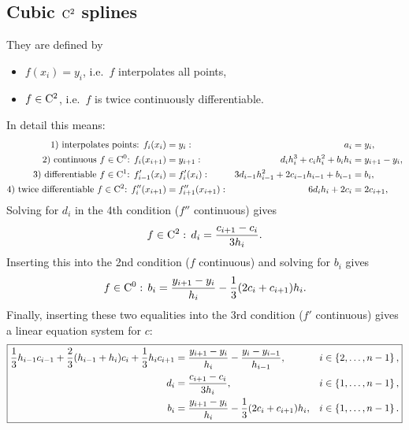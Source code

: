 \subsection{Cubic $\mathrm{C}^2$ splines}
They are defined by
\begin{itemize}
   \item $f(x_i) = y_i$, i.e.\ $f$ interpolates all points,
   \item $f\in\mathrm{C}^2$, i.e.\ $f$ is twice continuously differentiable.
\end{itemize}
In detail this means:
\begin{equation*}
\begin{aligned}
   \text{1) interpolates points: } f_i(x_i) & = y_i: &
    a_i & = y_i,\\
   \text{2) continuous } f\in\mathrm{C}^0 \text{: } f_i(x_{i+1}) & =y_{i+1}: &
	d_i h_i^3 + c_i h_i^2 + b_i h_i & = y_{i+1}-y_i,\\
  \text{3) differentiable }f\in\mathrm{C}^1 \text{: } f'_{i-1}(x_i) & =
    f'_i(x_i): &
    3 d_{i-1} h_{i-1}^2 + 2 c_{i-1} h_{i-1} + b_{i-1} & = b_i,\\
   \text{4) twice differentiable }f\in\mathrm{C}^2 \text{: } f''_i(x_{i+1}) & =
    f''_{i+1}(x_{i+1}): &
    6 d_i h_i + 2 c_i & = 2 c_{i+1},\\
\end{aligned}
\end{equation*}
Solving for $d_i$ in the 4th condition ($f''$ continuous) gives
\begin{equation*}
    f\in\mathrm{C}^2:\, d_i  =\frac{c_{i+1}-c_i}{3 h_i}.
\end{equation*}
Inserting this into the 2nd condition ($f$ continuous) and
solving for $b_i$ gives
\begin{equation*}
    f\in\mathrm{C}^0:\, b_i  = \frac{y_{i+1}-y_i}{h_i} - \frac{1}{3} (2 c_i + c_{i+1}) h_i.
\end{equation*}
Finally, inserting these two equalities into the 3rd condition
($f'$ continuous) gives a linear equation system for $c$:
\begin{equation}
\label{eq:cubic_c2_spline_coeffs}
\boxed{
\begin{aligned}
 \frac{1}{3} h_{i-1} c_{i-1} + \frac{2}{3} (h_{i-1}+h_i) c_i
 + \frac{1}{3} h_i c_{i+1}   & =
 \frac{y_{i+1}-y_i}{h_i} -  \frac{y_i-y_{i-1}}{h_{i-1}},
 & i\in\left\{ 2,\dots,n-1 \right\},\\
 d_i & =\frac{c_{i+1}-c_i}{3 h_i}, & i\in\left\{ 1,\dots,n-1 \right\},\\
  b_i & = \frac{y_{i+1}-y_i}{h_i} - \frac{1}{3} (2 c_i + c_{i+1}) h_i,
 & i\in\left\{ 1,\dots,n-1 \right\}.
\end{aligned}
}
\end{equation}

